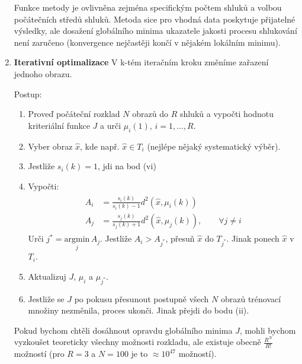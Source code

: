 \begin{enumerate}
Funkce metody je ovlivněna zejména specifickým počtem shluků a volbou počátečních středů shluků. Metoda sice pro vhodná data poskytuje přijatelné výsledky, ale dosažení globálního minima ukazatele jakosti  procesu shlukování není zaručeno (konvergence nejčastěji končí v nějakém lokálním minimu).
\vspace{1cm}
\item \textbf{Iterativní optimalizace}
V k-tém iteračním kroku změníme zařazení jednoho obrazu. 

Postup:
\begin{enumerate}[label=(\roman*)]
\item Proveď  počáteční rozklad $ N $ obrazů do $ R $ shluků a vypočti hodnotu kriteriální funkce $ J $ a urči $ \mu_i(1), \, i=1,...,R $.
\item Vyber obraz $ \hat{x} $, kde např. $ \hat{x} \in T_i $ (nejlépe nějaký systematický výběr).
\item Jestliže $ s_i(k) = 1 $, jdi na bod (vi)
\item Vypočti:
\begin{align}
\begin{split}
A_i &= \frac{s_i(k)}{s_i(k) - 1} d^2(\hat{x}, \mu_i(k)) \\
A_j &= \frac{s_j(k)}{s_j(k) + 1} d^2(\hat{x}, \mu_j(k)), \qquad \forall j \neq i
\end{split}
\end{align}
Urči $ j^* = \underset{j}{\mathrm{argmin}} \, A_j $. Jestliže $ A_i > A_{j^*} $, přesuň $ \hat{x} $ do $ T_{j^*} $. Jinak ponech $ \hat{x} $ v $ T_i $.
\item Aktualizuj $ J $, $ \mu_i $ a $ \mu_{j^*} $.
\item Jestliže se $ J $ po pokusu přesunout postupně všech $ N $ obrazů trénovací množiny nezměnila, proces ukonči. Jinak přejdi do bodu (ii).
\end{enumerate}

Pokud bychom chtěli dosáhnout opravdu globálního minima $ J $, mohli bychom vyzkoušet teoreticky všechny možnosti rozkladu, ale existuje obecně $ \frac{R^N}{R!} $ možností (pro $ R = 3 $ a $ N = 100 $ je to $ \approx 10^{47} $ možností).
\end{enumerate}
